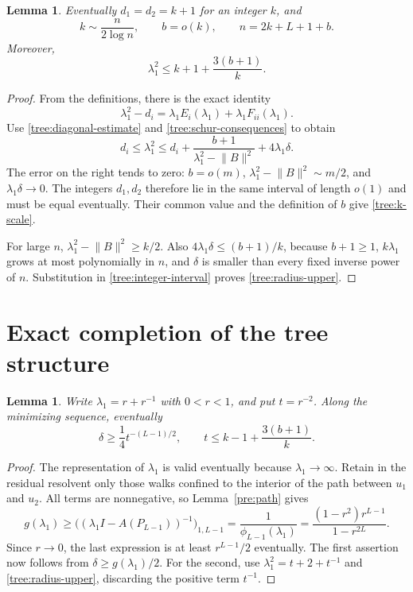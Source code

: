 \documentclass[11pt,a4paper]{article}
\numberwithin{equation}{section}
\newtheorem{lemma}[theorem]{Lemma}
\theoremstyle{definition}
\theoremstyle{remark}
\begin{document}
\begin{lemma}\label{tree:equal-degrees}
Eventually $d_1=d_2=k+1$ for an integer $k$, and
\begin{equation}\label{tree:k-scale}
 k\sim\frac{n}{2\log n},\qquad b=o(k),\qquad
 n=2k+L+1+b.
\end{equation}
Moreover,
\begin{equation}\label{tree:radius-upper}
 \lambda_1^2\leq k+1+\frac{3(b+1)}{k}.
\end{equation}
\end{lemma}

\begin{proof}
From the definitions, there is the exact identity
\[
 \lambda_1^2-d_i
 =\lambda_1E_i(\lambda_1)+\lambda_1F_{ii}(\lambda_1).
\]
Use \eqref{tree:diagonal-estimate} and
\eqref{tree:schur-consequences} to obtain
\begin{equation}\label{tree:integer-interval}
 d_i\leq\lambda_1^2\leq
 d_i+\frac{b+1}{\lambda_1^2-\lVert B\rVert^2}
       +4\lambda_1\delta.
\end{equation}
The error on the right tends to zero: $b=o(m)$,
$\lambda_1^2-\lVert B\rVert^2\sim m/2$, and
$\lambda_1\delta\to0$. The integers $d_1,d_2$ therefore lie in the
same interval of length $o(1)$ and must be equal eventually.
Their common value and the definition of $b$ give
\eqref{tree:k-scale}.

For large $n$,
$\lambda_1^2-\lVert B\rVert^2\geq k/2$.
Also $4\lambda_1\delta\leq(b+1)/k$, because $b+1\geq1$,
$k\lambda_1$ grows at most polynomially in $n$, and $\delta$ is
smaller than every fixed inverse power of $n$. Substitution in
\eqref{tree:integer-interval} proves \eqref{tree:radius-upper}.
\end{proof}

\section{Exact completion of the tree structure}
\label{tree:completion-section}

\begin{lemma}\label{tree:path-comparison}
Write $\lambda_1=r+r^{-1}$ with $0<r<1$, and put $t=r^{-2}$.
Along the minimizing sequence, eventually
\begin{equation}\label{tree:path-comparison-bound}
 \delta\geq\frac14t^{-(L-1)/2},\qquad
 t\leq k-1+\frac{3(b+1)}k.
\end{equation}
\end{lemma}

\begin{proof}
The representation of $\lambda_1$ is valid eventually because
$\lambda_1\to\infty$. Retain in the residual resolvent only those
walks confined to the interior of the path between $u_1$ and $u_2$.
All terms are nonnegative, so Lemma~\ref{pre:path} gives
\[
 g(\lambda_1)\geq
 \bigl((\lambda_1I-A(P_{L-1}))^{-1}\bigr)_{1,L-1}
 =\frac1{\phi_{L-1}(\lambda_1)}
 =\frac{(1-r^2)r^{L-1}}{1-r^{2L}}.
\]
Since $r\to0$, the last expression is at least
$r^{L-1}/2$ eventually. The first assertion now follows from
$\delta\geq g(\lambda_1)/2$.
For the second, use
$\lambda_1^2=t+2+t^{-1}$ and \eqref{tree:radius-upper}, discarding
the positive term $t^{-1}$.
\end{proof}
\end{document}
